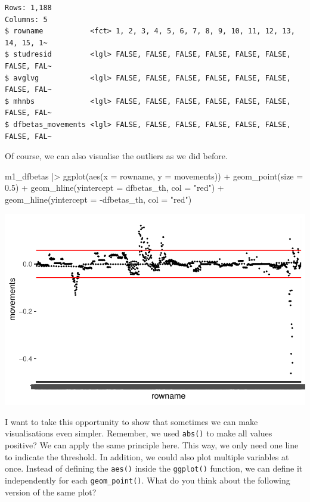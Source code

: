 \documentclass[
  letterpaper,
]{krantz}
\makeatletter
\newenvironment{Shaded}{\begin{snugshade}}{\end{snugshade}}
\newcommand{\AttributeTok}[1]{\textcolor[rgb]{0.40,0.45,0.13}{#1}}
\newcommand{\FloatTok}[1]{\textcolor[rgb]{0.68,0.00,0.00}{#1}}
\newcommand{\FunctionTok}[1]{\textcolor[rgb]{0.28,0.35,0.67}{#1}}
\newcommand{\NormalTok}[1]{\textcolor[rgb]{0.00,0.23,0.31}{#1}}
\newcommand{\SpecialCharTok}[1]{\textcolor[rgb]{0.37,0.37,0.37}{#1}}
\newcommand{\StringTok}[1]{\textcolor[rgb]{0.13,0.47,0.30}{#1}}
\newenvironment{kframe}{%
\medskip{}
\setlength{\fboxsep}{.8em}
 \def\at@end@of@kframe{}%
 \ifinner\ifhmode%
  \def\at@end@of@kframe{\end{minipage}}%
  \begin{minipage}{\columnwidth}%
 \fi\fi%
 \def\FrameCommand##1{\hskip\@totalleftmargin \hskip-\fboxsep
 \colorbox{shadecolor}{##1}\hskip-\fboxsep
     \hskip-\linewidth \hskip-\@totalleftmargin \hskip\columnwidth}%
 \MakeFramed {\advance\hsize-\width
   \@totalleftmargin\z@ \linewidth\hsize
   \@setminipage}}%
 {\par\unskip\endMakeFramed%
 \at@end@of@kframe}
\renewenvironment{Shaded}{\begin{kframe}}{\end{kframe}}
\makeatother
\begin{document}
\begin{verbatim}
Rows: 1,188
Columns: 5
$ rowname           <fct> 1, 2, 3, 4, 5, 6, 7, 8, 9, 10, 11, 12, 13, 14, 15, 1~
$ studresid         <lgl> FALSE, FALSE, FALSE, FALSE, FALSE, FALSE, FALSE, FAL~
$ avglvg            <lgl> FALSE, FALSE, FALSE, FALSE, FALSE, FALSE, FALSE, FAL~
$ mhnbs             <lgl> FALSE, FALSE, FALSE, FALSE, FALSE, FALSE, FALSE, FAL~
$ dfbetas_movements <lgl> FALSE, FALSE, FALSE, FALSE, FALSE, FALSE, FALSE, FAL~
\end{verbatim}

Of course, we can also visualise the outliers as we did before.

\begin{Shaded}
\begin{Highlighting}[]
\NormalTok{m1\_dfbetas }\SpecialCharTok{|\textgreater{}}
  \FunctionTok{ggplot}\NormalTok{(}\FunctionTok{aes}\NormalTok{(}\AttributeTok{x =}\NormalTok{ rowname,}
             \AttributeTok{y =}\NormalTok{ movements)) }\SpecialCharTok{+}
  \FunctionTok{geom\_point}\NormalTok{(}\AttributeTok{size =} \FloatTok{0.5}\NormalTok{) }\SpecialCharTok{+}
  \FunctionTok{geom\_hline}\NormalTok{(}\AttributeTok{yintercept =}\NormalTok{ dfbetas\_th, }\AttributeTok{col =} \StringTok{"red"}\NormalTok{) }\SpecialCharTok{+}
  \FunctionTok{geom\_hline}\NormalTok{(}\AttributeTok{yintercept =} \SpecialCharTok{{-}}\NormalTok{dfbetas\_th, }\AttributeTok{col =} \StringTok{"red"}\NormalTok{)}
\end{Highlighting}
\end{Shaded}

\includegraphics{13_regressions_files/figure-pdf/dfbetas-plot-outliers-1.pdf}

I want to take this opportunity to show that sometimes we can make
visualisations even simpler. Remember, we used \texttt{abs()} to make
all values positive? We can apply the same principle here. This way, we
only need one line to indicate the threshold. In addition, we could also
plot multiple variables at once. Instead of defining the \texttt{aes()}
inside the \texttt{ggplot()} function, we can define it independently
for each \texttt{geom\_point()}. What do you think about the following
version of the same plot?
\end{document}
